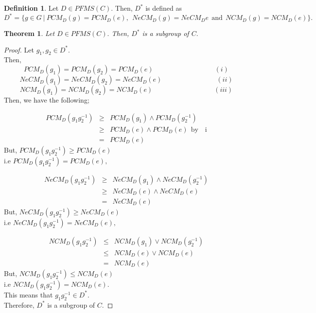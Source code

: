 \documentclass[12pt,letterpaper]{amsart}
\theoremstyle{plain}
\newtheorem{theorem}{Theorem}[section]
\theoremstyle{definition}
\newtheorem{definition}{Definition}[section]
\numberwithin{equation}{section}
\begin{document}
\begin{definition}
Let $D \in PFMS(C).$ Then, $D^{\ast}$ is defined as $$D^{\ast} = \lbrace g \in G~|~PCM_D(g) = PCM_D(e),~~ NeCM_D(g) = NeCM_D{e}~~ \text{and}~~ NCM_D(g) = NCM_D(e) \rbrace.$$
\end{definition}

\begin{theorem}
Let $D \in PFMS(C).$ Then, $D^{\ast}$ is a subgroup of $C.$
\end{theorem}

\begin{proof}
Let $g_1, g_2 \in D^{\ast}.$\\ Then, $$PCM_D(g_1) = PCM_D(g_2) = PCM_D(e)\quad \quad \quad \quad \quad \quad \quad \quad \quad(i)$$ 
$$NeCM_D(g_1) = NeCM_D(g_2) = NeCM_D(e) \quad \quad \quad \quad \quad \quad \quad \quad (ii)$$
$$NCM_D(g_1) = NCM_D(g_2) = NCM_D(e)\quad \quad \quad \quad \quad \quad \quad \quad \quad(iii)$$
Then, we have the following;

\begin{eqnarray*}
PCM_{D}(g_1 g_2^{-1}) & \geq & PCM_{D}(g_1) \wedge PCM_{D}(g_2^{-1}) \\
& \geq & PCM_{D}(e) \wedge PCM_{D}(e)~~\text{by~~ i}\\
& = & PCM_{D}(e)
\end{eqnarray*}
But, $PCM_{D}(g_1 g_2^{-1}) \geq PCM_{D}(e)$\\ i.e $PCM_{D}(g_1 g_2^{-1}) = PCM_{D}(e),$

\begin{eqnarray*}
NeCM_{D}(g_1 g_2^{-1}) & \geq & NeCM_{D}(g_1) \wedge NeCM_{D}(g_2^{-1}) \\
& \geq & NeCM_{D}(e) \wedge NeCM_{D}(e)\\
& = & NeCM_{D}(e)
\end{eqnarray*}
But, $NeCM_{D}(g_1 g_2^{-1}) \geq NeCM_{D}(e)$\\ i.e $NeCM_{D}(g_1 g_2^{-1}) = NeCM_{D}(e),$

\begin{eqnarray*}
NCM_{D}(g_1 g_2^{-1}) & \leq & NCM_{D}(g_1) \vee NCM_{D}(g_2^{-1}) \\
& \leq & NCM_{D}(e) \vee NCM_{D}(e)\\
& = & NCM_{D}(e)
\end{eqnarray*}
But, $NCM_{D}(g_1 g_2^{-1}) \leq NCM_{D}(e)$\\ i.e $NCM_{D}(g_1 g_2^{-1}) = NCM_{D}(e).$\\
This means that $g_1 g_2^{-1} \in D^{\ast}.$\\ Therefore, $D^{\ast}$ is a subgroup of $C.$
\end{proof}
\end{document}
